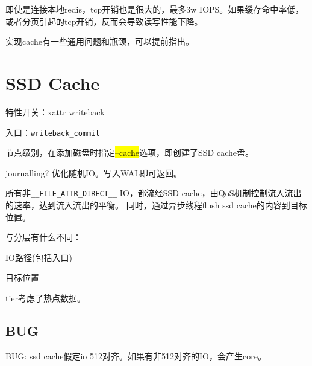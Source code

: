 即使是连接本地redis，tcp开销也是很大的，最多3w IOPS。如果缓存命中率低，或者分页引起的tcp开销，反而会导致读写性能下降。

实现cache有一些通用问题和瓶颈，可以提前指出。

\section{SSD Cache}

特性开关：xattr writeback

入口：\verb|writeback_commit|

节点级别，在添加磁盘时指定\hl{--cache}选项，即创建了SSD cache盘。

journalling? 优化随机IO。写入WAL即可返回。

所有非\verb|__FILE_ATTR_DIRECT__| IO，都流经SSD cache，由QoS机制控制流入流出的速率，达到流入流出的平衡。
同时，通过异步线程flush ssd cache的内容到目标位置。

与分层有什么不同：
\begin{compactitem}
\item IO路径(包括入口)
\item 目标位置
\end{compactitem}

tier考虑了热点数据。

\subsection{BUG}

BUG: ssd cache假定io 512对齐。如果有非512对齐的IO，会产生core。
